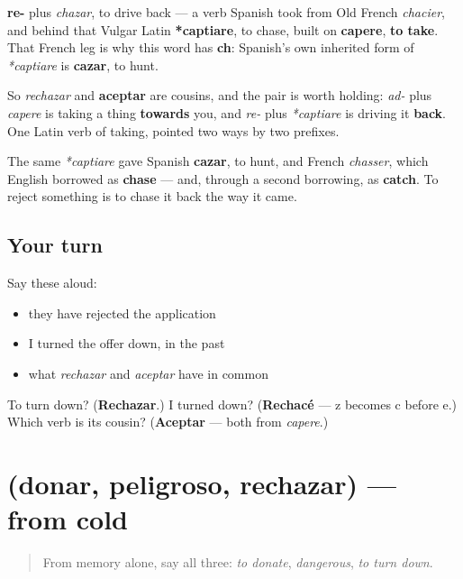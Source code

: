 \begin{cousinweb}
\textbf{re-} plus \emph{chazar}, to drive back — a verb Spanish took from Old French \emph{chacier}, and behind that Vulgar Latin \textbf{*captiare}, to chase, built on \textbf{capere}, \textbf{to take}. That French leg is why this word has \textbf{ch}: Spanish's own inherited form of \emph{*captiare} is \textbf{cazar}, to hunt.

So \emph{rechazar} and \textbf{aceptar} are cousins, and the pair is worth holding: \emph{ad-} plus \emph{capere} is taking a thing \textbf{towards} you, and \emph{re-} plus \emph{*captiare} is driving it \textbf{back}. One Latin verb of taking, pointed two ways by two prefixes.

The same \emph{*captiare} gave Spanish \textbf{cazar}, to hunt, and French \emph{chasser}, which English borrowed as \textbf{chase} — and, through a second borrowing, as \textbf{catch}. To reject something is to chase it back the way it came.
\end{cousinweb}

\subsection*{Your turn}
Say these aloud:

\begin{itemize}
\raggedright
  \item they have rejected the application
  \item I turned the offer down, in the past
  \item what \emph{rechazar} and \emph{aceptar} have in common
\end{itemize}

\begin{tcolorbox}[breakable,colback=teal!4,colframe=teal!35!black,title={Before you move on}]
To turn down? (\textbf{Rechazar}.) I turned down? (\textbf{Rechacé} — z becomes c before e.) Which verb is its cousin? (\textbf{Aceptar} — both from \emph{capere}.)
\end{tcolorbox}
\section[(donar, peligroso, rechazar)]{(donar, peligroso, rechazar) — from cold}

\label{lesson:ES-R461-repaso-donar}



\begin{quote}
From memory alone, say all three: \emph{to donate}, \emph{dangerous}, \emph{to turn down}.
\end{quote}


